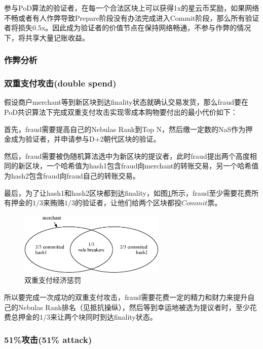 参与PoD算法的验证者，在每一个合法区块上可以获得1x的星云币奖励，如果网络不畅或者有人作弊导致Prepare阶段没有办法完成进入Commit阶段，那么所有验证者将损失0.5x。因此成为验证者的价值节点在保持网络畅通，不参与作弊的情况下，将共享大量记账收益。

\subsubsection{作弊分析}
\label{pod:economic:fraud}

\subsubsection*{双重支付攻击(double spend)}
\label{pod:economic:fraud:double_spend}

假设商户merchant等到新区块到达finality状态就确认交易发货，那么fraud要在PoD共识算法下完成双重支付攻击实现零成本购物要付出的最小代价如下：

首先，fraud需要提高自己的Nebulas Rank到Top N，然后缴一定数的NaS作为押金成为验证者，并申请参与D+2朝代区块的验证。

然后，fraud需要被伪随机算法选中为新区块的提议者，此时fraud提出两个高度相同的新区块，一个哈希值为hash1包含fraud向merchant的转账交易，另一个哈希值为hash2包含fraud向fraud自己的转账交易。

最后，为了让hash1和hash2区块都到达finality，如图\ref{fig:double_spend}所示，fraud至少需要花费所有押金的$1/3$来贿赂$1/3$的验证者，让他们给两个区块都投$Commit$票。

\begin{figure}[h]
\centering
\includegraphics[width=7cm]{./figs/overlap}
\caption{双重支付经济惩罚}
\label{fig:double_spend}
\end{figure}

所以要完成一次成功的双重支付攻击，fraud需要花费一定的精力和财力来提升自己的Nebulas Rank排名（见抵抗操纵），然后等到幸运地被选为提议者时，至少花费总押金的$1/3$来让两个块同时到达finality状态。

\subsubsection*{51\%攻击(51\% attack)}
\label{pod:economic:fraud:51attack}


